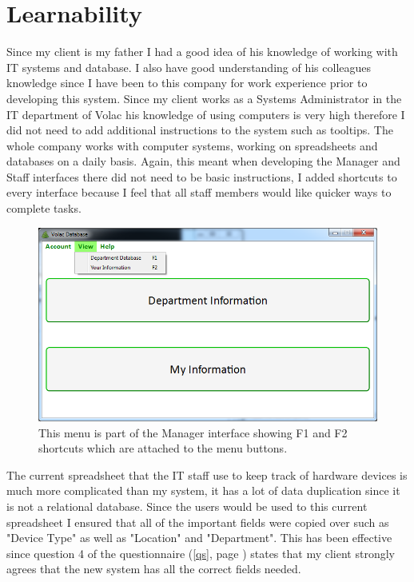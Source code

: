 \section{Learnability}

Since my client is my father I had a good idea of his knowledge of working with IT systems and database. I also have good understanding of his colleagues knowledge since I have been to this company for work experience prior to developing this system. Since my client works as a Systems Administrator in the IT department of Volac his knowledge of using computers is very high therefore I did not need to add additional instructions to the system such as tooltips. The whole company works with computer systems, working on spreadsheets and databases on a daily basis. Again, this meant when developing the Manager and Staff interfaces there did not need to be basic instructions, I added shortcuts to every interface because I feel that all staff members would like quicker ways to complete tasks.

\begin{figure}[H]
    \includegraphics[width=\textwidth]{./Evaluation/Images/shortcuts2.png}
    \caption{This menu is part of the Manager interface showing F1 and F2 shortcuts which are attached to the menu buttons.} 
\end{figure}


The current spreadsheet that the IT staff use to keep track of hardware devices is much more complicated than my system, it has a lot of data duplication since it is not a relational database. Since the users would be used to this current spreadsheet I ensured that all of the important fields were copied over such as "Device Type" as well as "Location" and "Department". This has been effective since question 4 of the questionnaire (\ref{qs}, page \pageref{qs}) states that my client strongly agrees that the new system has all the correct fields needed.

